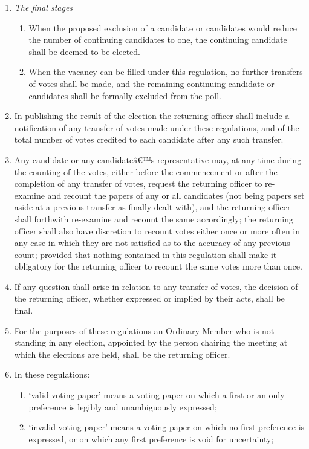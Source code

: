 \documentclass{article}
\begin{document}
\begin{enumerate}
\item \textit{The final stages}
  \begin{enumerate}
  \item When the proposed exclusion of a candidate or candidates would
  reduce the number of continuing candidates to one, the continuing
  candidate shall be deemed to be elected.
  \item When the vacancy can be filled under this regulation, no further
  transfers of votes shall be made, and the remaining continuing candidate or candidates shall be formally excluded from the poll.
  \end{enumerate}
\item In publishing the result of the election the returning officer shall include
a notification of any transfer of votes made under these regulations, and
of the total number of votes credited to each candidate after any such
transfer.
\item Any candidate or any candidateâ€™s representative may, at any time during
the counting of the votes, either before the commencement or after the
completion of any transfer of votes, request the returning officer to re-examine and recount the papers of any or all candidates (not being papers
set aside at a previous transfer as finally dealt with), and the returning
officer shall forthwith re-examine and recount the same accordingly; the
returning officer shall also have discretion to recount votes either once or
more often in any case in which they are not satisfied as to the accuracy
of any previous count; provided that nothing contained in this regulation
shall make it obligatory for the returning officer to recount the same votes
more than once.
\item If any question shall arise in relation to any transfer of votes, the decision
of the returning officer, whether expressed or implied by their acts,
shall be final.
\item For the purposes of these regulations an Ordinary Member who is not
standing in any election, appointed by the person chairing the meeting at
which the elections are held, shall be the returning officer.
\item In these regulations:
  \begin{enumerate}
  \item `valid voting-paper' means a voting-paper on which a first or an only
  preference is legibly and unambiguously expressed;
  \item `invalid voting-paper' means a voting-paper on which no first preference is expressed, or on which any first preference is void for uncertainty;

\end{enumerate}
\end{enumerate}
\end{document}
